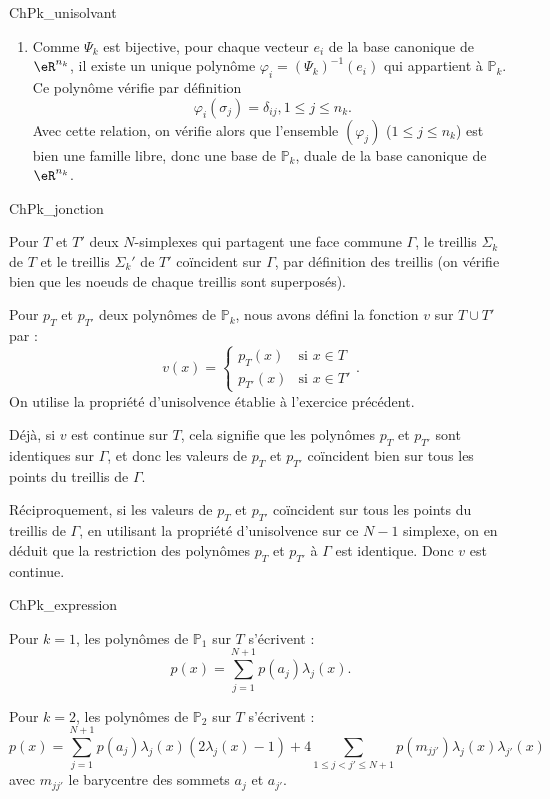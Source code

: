 \begin{corrige}{ChPk_unisolvant}
\begin{enumerate}
\item Comme $\Psi_k$ est bijective, pour chaque vecteur $e_i$ de la base canonique de $\eR^{n_k}$, il existe un unique polynôme $\varphi_i = (\Psi_k)^{-1} ( e_i)$ qui appartient à $\mathbb{P}_k$. Ce polynôme vérifie par définition 
\[
\varphi_i(\sigma_j) = \delta_{ij}, 1 \leq j \leq n_k.
\]
Avec cette relation, on vérifie alors que l'ensemble $(\varphi_j)$ ($1 \leq j \leq n_k$) est bien une famille libre, donc une base de $\mathbb{P}_k$, duale de la base canonique de $\eR^{n_k}$.

\end{enumerate}

\end{corrige}

\medskip

\begin{corrige}{ChPk_jonction}

Pour $T$ et $T'$ deux $N$-simplexes qui partagent une face commune $\Gamma$, le treillis $\Sigma_k$ de $T$ et le treillis $\Sigma_k'$ de $T'$ coïncident sur $\Gamma$, par définition des treillis (on vérifie bien que les noeuds de chaque treillis sont superposés).

\medskip

Pour $p_T$ et $p_{T'}$ deux polynômes de $\mathbb{P}_k$, nous avons défini la fonction $v$  sur $T \cup T'$ par :
\[
v(x) = \left \{
\begin{array}{ll}
p_T(x) &\mbox{si } x \in T\\
p_{T'}(x) &\mbox{si } x \in T'
\end{array}
\right. .
\]
On utilise la propriété d'unisolvence établie à l'exercice précédent.

\medskip

Déjà, si $v$ est continue sur $T$, cela signifie que les polynômes $p_T$ et $p_{T'}$ sont identiques sur $\Gamma$, et donc les valeurs de $p_T$ et $p_{T'}$ coïncident bien sur tous les points du treillis de $\Gamma$.

\medskip

Réciproquement, si les valeurs de $p_T$ et $p_{T'}$ coïncident sur tous les points du treillis de $\Gamma$, en utilisant la propriété d'unisolvence sur ce $N-1$ simplexe, on en déduit que la restriction des polynômes $p_T$ et $p_{T'}$ à $\Gamma$ est identique. Donc $v$ est continue.

\end{corrige}

\medskip

\begin{corrige}{ChPk_expression}

Pour $k=1$, les polynômes de $\mathbb{P}_1$ sur $T$ s'écrivent :
\[
p(x) = \sum_{j=1}^{N+1}  p(a_j) \lambda_j(x). 
\]

Pour $k=2$, les polynômes de $\mathbb{P}_2$ sur $T$ s'écrivent :
\[
p(x) = \sum_{j=1}^{N+1}  p(a_j) \lambda_j(x) (2 \lambda_j (x) - 1)
+ 4 \sum_{1\leq j < j' \leq N+1} p(m_{jj'}) \lambda_j(x) \lambda_{j'} (x)
\]
avec $m_{jj'}$ le barycentre des sommets $a_j$ et $a_{j'}$.

\end{corrige}

